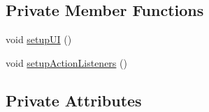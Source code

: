 \subsection*{Private Member Functions}
\begin{DoxyCompactItemize}
\item 
void \mbox{\hyperlink{classcom_1_1activitytracker_1_1_create_user_window_a41715d85194c6bb84cf6969f771940dc}{setup\+UI}} ()
\item 
void \mbox{\hyperlink{classcom_1_1activitytracker_1_1_create_user_window_a174a05a389ca6f3b7979ac9c5028a3ae}{setup\+Action\+Listeners}} ()
\end{DoxyCompactItemize}
\subsection*{Private Attributes}
